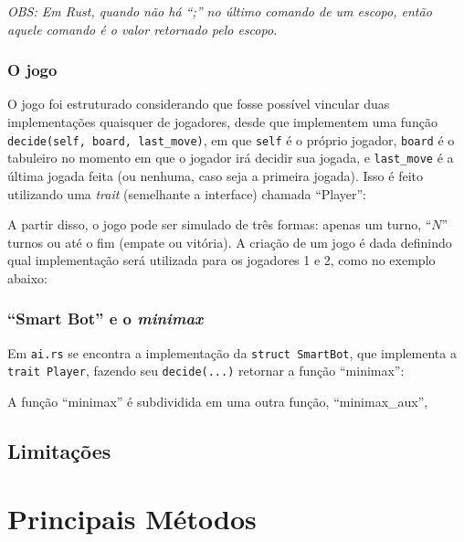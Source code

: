 \documentclass{article}
\newcommand{\todo}[1]{{\color{red}{#1}}}
\newcommand{\rustinline}[1]{\texttt{#1}}
\begin{document}
    \textit{OBS\@: Em Rust, quando não há ``;'' no último comando de um escopo,
    então aquele comando é o valor retornado pelo escopo.}

    \subsubsection{O jogo}

    O jogo foi estruturado considerando que fosse possível vincular duas
    implementações quaisquer de jogadores, desde que implementem uma função
    \rustinline{decide(self, board, last_move)}, em que \texttt{self} é
    o próprio jogador, \texttt{board} é o tabuleiro no momento em que o jogador
    irá decidir sua jogada, e \texttt{last\_move} é a última jogada feita (ou
    nenhuma, caso seja a primeira jogada). Isso é feito utilizando uma
    \textit{trait} (semelhante a interface) chamada ``Player'':


    A partir disso, o jogo pode ser simulado de três formas: apenas um turno,
    ``$N$'' turnos ou até o fim (empate ou vitória). A criação de um jogo é
    dada definindo qual implementação será utilizada para os jogadores 1 e 2,
    como no exemplo abaixo:


    \subsubsection{``Smart Bot'' e o \textit{minimax}}

    Em \texttt{ai.rs} se encontra a implementação da \rustinline{struct
    SmartBot}, que implementa a \rustinline{trait Player}, fazendo seu
    \rustinline{decide(...)} retornar a função ``minimax'':


    A função ``minimax'' é subdividida em uma outra função, ``minimax\_aux'',
    \todo{Mas essa parte o Cauê sabe melhor} \todo{AVANÇA NESSA CAVALA IMUNDA.}

    \subsection{Limitações}

    \todo{AVANÇA NESSA CAVALA IMUNDA.}

    \section{Principais Métodos}
\end{document}

